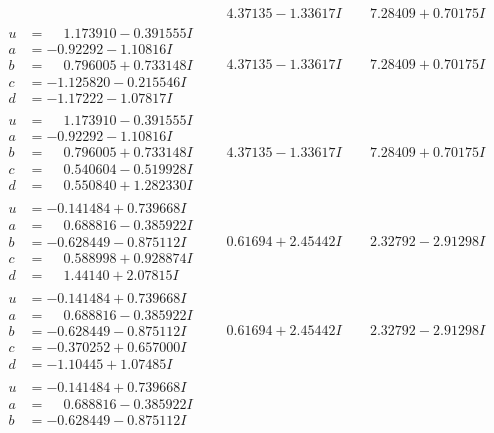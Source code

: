 \documentclass[1p]{elsarticle_modified}
\theoremstyle{definition}
\begin{document}
$$\begin{array}{c|c|c}
 & \phantom{-}4.37135 - 1.33617 I & \phantom{-}7.28409 + 0.70175 I \\ \hline\begin{aligned}
u &= \phantom{-}1.173910 - 0.391555 I \\
a &= -0.92292 - 1.10816 I \\
b &= \phantom{-}0.796005 + 0.733148 I \\
c &= -1.125820 - 0.215546 I \\
d &= -1.17222 - 1.07817 I\end{aligned}
 & \phantom{-}4.37135 - 1.33617 I & \phantom{-}7.28409 + 0.70175 I \\ \hline\begin{aligned}
u &= \phantom{-}1.173910 - 0.391555 I \\
a &= -0.92292 - 1.10816 I \\
b &= \phantom{-}0.796005 + 0.733148 I \\
c &= \phantom{-}0.540604 - 0.519928 I \\
d &= \phantom{-}0.550840 + 1.282330 I\end{aligned}
 & \phantom{-}4.37135 - 1.33617 I & \phantom{-}7.28409 + 0.70175 I \\ \hline\begin{aligned}
u &= -0.141484 + 0.739668 I \\
a &= \phantom{-}0.688816 - 0.385922 I \\
b &= -0.628449 - 0.875112 I \\
c &= \phantom{-}0.588998 + 0.928874 I \\
d &= \phantom{-}1.44140 + 2.07815 I\end{aligned}
 & \phantom{-}0.61694 + 2.45442 I & \phantom{-}2.32792 - 2.91298 I \\ \hline\begin{aligned}
u &= -0.141484 + 0.739668 I \\
a &= \phantom{-}0.688816 - 0.385922 I \\
b &= -0.628449 - 0.875112 I \\
c &= -0.370252 + 0.657000 I \\
d &= -1.10445 + 1.07485 I\end{aligned}
 & \phantom{-}0.61694 + 2.45442 I & \phantom{-}2.32792 - 2.91298 I \\ \hline\begin{aligned}
u &= -0.141484 + 0.739668 I \\
a &= \phantom{-}0.688816 - 0.385922 I \\
b &= -0.628449 - 0.875112 I \\

\end{aligned}
\end{array}$$
\end{document}
